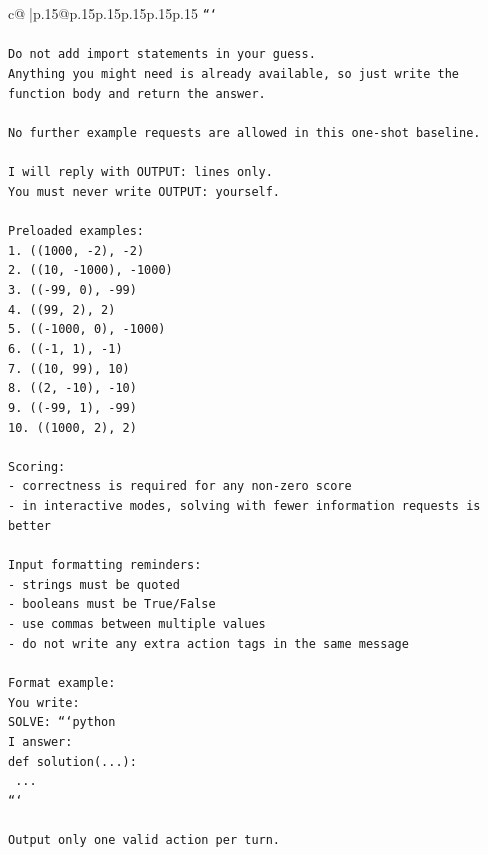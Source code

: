 \documentclass{article}
\begin{document}
{\begin{supertabular}{c@{$\;$}|p{.15\linewidth}@{}p{.15\linewidth}p{.15\linewidth}p{.15\linewidth}p{.15\linewidth}p{.15\linewidth}}
{{{\texttt{```} \\
\\ 
\texttt{Do not add import statements in your guess.} \\
\texttt{Anything you might need is already available, so just write the function body and return the answer.} \\
\\ 
\texttt{No further example requests are allowed in this one{-}shot baseline.} \\
\\ 
\texttt{I will reply with OUTPUT: lines only.} \\
\texttt{You must never write OUTPUT: yourself.} \\
\\ 
\texttt{Preloaded examples:} \\
\texttt{1. ((1000, {-}2), {-}2)} \\
\texttt{2. ((10, {-}1000), {-}1000)} \\
\texttt{3. (({-}99, 0), {-}99)} \\
\texttt{4. ((99, 2), 2)} \\
\texttt{5. (({-}1000, 0), {-}1000)} \\
\texttt{6. (({-}1, 1), {-}1)} \\
\texttt{7. ((10, 99), 10)} \\
\texttt{8. ((2, {-}10), {-}10)} \\
\texttt{9. (({-}99, 1), {-}99)} \\
\texttt{10. ((1000, 2), 2)} \\
\\ 
\texttt{Scoring:} \\
\texttt{{-} correctness is required for any non{-}zero score} \\
\texttt{{-} in interactive modes, solving with fewer information requests is better} \\
\\ 
\texttt{Input formatting reminders:} \\
\texttt{{-} strings must be quoted} \\
\texttt{{-} booleans must be True/False} \\
\texttt{{-} use commas between multiple values} \\
\texttt{{-} do not write any extra action tags in the same message} \\
\\ 
\texttt{Format example:} \\
\texttt{You write:} \\
\texttt{SOLVE: ```python} \\
\texttt{I answer:} \\
\texttt{def solution(...):} \\
\texttt{    ...} \\
\texttt{```} \\
\\ 
\texttt{Output only one valid action per turn.} \\
            }
        }
    }
     \\ \\


\end{supertabular}}
\end{document}
